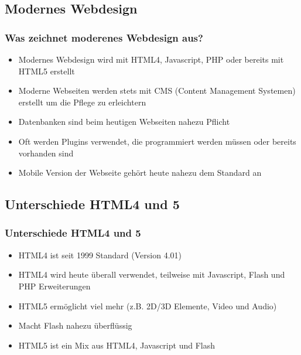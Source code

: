 \documentclass[xcolor=dvipsnames]{beamer}
\begin{document}
\subsection{Modernes Webdesign}
\begin{frame} %
  \frametitle{Was zeichnet moderenes Webdesign aus?} %
  \begin{block}{}
	\begin{itemize}
		\item Modernes Webdesign wird mit HTML4, Javascript, PHP oder bereits mit HTML5 erstellt
		\item Moderne Webseiten werden stets mit CMS (Content Management Systemen) erstellt um die Pflege zu erleichtern
		\item Datenbanken sind beim heutigen Webseiten nahezu Pflicht
		\item Oft werden Plugins verwendet, die programmiert werden müssen oder bereits vorhanden sind
		\item Mobile Version der Webseite gehört heute nahezu dem Standard an
	\end{itemize}
  \end{block}
\end{frame}


\subsection{Unterschiede HTML4 und 5}
\begin{frame} %
  \frametitle{Unterschiede HTML4 und 5} %
  \begin{block}{}
	\begin{itemize}
		\item HTML4 ist seit 1999 Standard (Version 4.01)
		\item HTML4 wird heute überall verwendet, teilweise mit Javascript, Flash und PHP Erweiterungen
		\item HTML5 ermöglicht viel mehr (z.B. 2D/3D Elemente, Video und Audio)
		\item Macht Flash nahezu überflüssig
		\item HTML5 ist ein Mix aus HTML4, Javascript und Flash
	\end{itemize}
  \end{block}
\end{frame}
\end{document}
